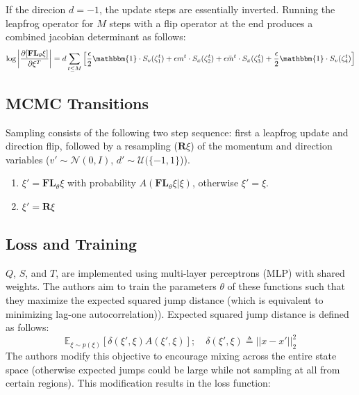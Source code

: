 \documentclass[twoside]{article}
\begin{document}
If the direcion $d=-1$, the update steps are essentially inverted. Running the leapfrog operator for $M$ steps with a flip operator at the end produces a combined jacobian determinant as follows:
\begin{equation}
    \text{log} \left|\frac{\partial[\textbf{FL}_\theta\xi]}{\partial \xi^T}\right| = d \sum_{t\leq M} \left[\frac{\epsilon}{2}\mathbbm{1} \cdot S_v(\zeta_1^t) + \epsilon m^t \cdot S_x(\zeta_2^t) + \epsilon \Bar{m}^t \cdot S_x(\zeta_3^t) + \frac{\epsilon}{2}\mathbbm{1} \cdot S_v(\zeta_4^t)\right]
\end{equation}

\subsection{MCMC Transitions}
Sampling consists of the following two step sequence: first a leapfrog update and direction flip, followed by a resampling ($\textbf{R}\xi$) of the momentum and direction variables ($v' \sim \mathcal{N}(0,I)$, $d' \sim \mathcal{U}(\{-1,1\}$)).
\begin{enumerate}
    \item $\xi' = \textbf{FL}_\theta \xi$ with probability $A(\textbf{FL}_\theta\xi|\xi)$, otherwise $\xi'=\xi$.
    \item $\xi' = \textbf{R}\xi$
\end{enumerate}

\subsection{Loss and Training}
$Q$, $S$, and $T$, are implemented using multi-layer perceptrons (MLP) with shared weights. The authors aim to train the parameters $\theta$ of these functions such that they maximize the expected squared jump distance (which is equivalent to minimizing lag-one autocorrelation)\citep{Pasarica2003}). Expected squared jump distance is defined as follows:
\begin{equation}
    \mathbb{E}_{\xi \sim p(\xi)} [\delta(\xi',\xi)A(\xi',\xi)]; \quad \delta(\xi',\xi) \triangleq ||x-x'||_2^2
\end{equation}
The authors modify this objective to encourage mixing across the entire state space (otherwise expected jumps could be large while not sampling at all from certain regions). This modification results in the loss function:
\end{document}
